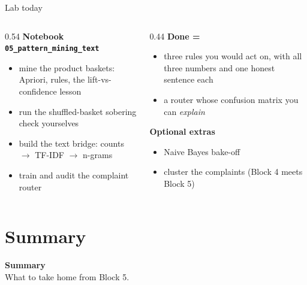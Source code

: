 \documentclass[10pt,aspectratio=169]{beamer}
\begin{document}
\begin{frame}{Lab today}
  \begin{columns}[T]
    \begin{column}{0.54\textwidth}
      \textbf{Notebook \texttt{05\_pattern\_mining\_text}}
      \begin{itemize}\small
        \item mine the product baskets: Apriori, rules, the
              lift-vs-confidence lesson
        \item run the shuffled-basket sobering check yourselves
        \item build the text bridge: counts $\to$ TF-IDF $\to$ n-grams
        \item train and audit the complaint router
      \end{itemize}
    \end{column}
    \begin{column}{0.44\textwidth}
      \textbf{Done =}
      \begin{itemize}\small
        \item three rules you would act on, with all three numbers and one
              honest sentence each
        \item a router whose confusion matrix you can \emph{explain}
      \end{itemize}
      \vspace{0.3em}
      \textbf{Optional extras}
      \begin{itemize}\small
        \item Naive Bayes bake-off
        \item cluster the complaints (Block 4 meets Block 5)
      \end{itemize}
    \end{column}
  \end{columns}
\end{frame}

\section{Summary}

\begin{frame}[plain]
  \begin{center}
    \vspace{1.5cm}
    {\LARGE\textbf{Summary}}\\[0.6cm]
    {\normalsize What to take home from Block 5.}
  \end{center}
\end{frame}
\end{document}
